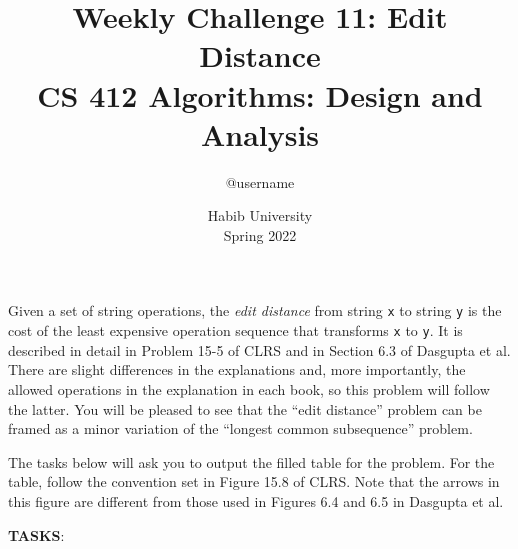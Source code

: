 \documentclass[a4paper]{exam}
\title{Weekly Challenge 11: Edit Distance\\CS 412 Algorithms: Design and Analysis}
\author{@username}  %
\date{Habib University\\Spring 2022}
\begin{document}
\maketitle

\begin{questions}
  

  Given a set of string operations, the \textit{edit distance} from string \texttt{x} to string \texttt{y} is the cost of the least expensive operation sequence that transforms \texttt{x} to \texttt{y}. It is described in detail in Problem 15-5 of CLRS and in Section 6.3 of Dasgupta et al. There are slight differences in the explanations and, more importantly, the allowed operations in the explanation in each book, so this problem will follow the latter. You will be pleased to see that the ``edit distance'' problem can be framed as a minor variation of the ``longest common subsequence'' problem.

  The tasks below will ask you to output the filled table for the problem. For the table, follow the convention set in Figure 15.8 of CLRS. Note that the arrows in this figure are different from those used in Figures 6.4 and 6.5 in Dasgupta et al. 

  \textbf{TASKS}:
 
  \begin{solution}
  \end{solution}
\end{questions}
\end{document}
